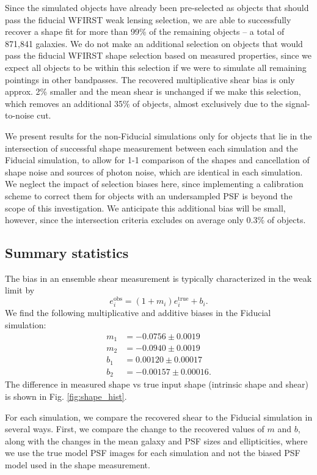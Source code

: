 \documentclass[aps,prd, amsmath,amssymb,superscriptaddress,showkeys,nofootinbib,reprint,preprintnumbers]{revtex4-1}
\begin{document}
Since the simulated objects have already been pre-selected as objects that should pass the fiducial WFIRST weak lensing selection, we are able to successfully recover a shape fit for more than 99\% of the remaining objects -- a total of 871,841 galaxies. 
We do not make an additional selection on objects that would pass the fiducial WFIRST shape selection based on measured properties, since we expect all objects to be within this selection if we were to simulate all remaining pointings in other bandpasses. 
The recovered multiplicative shear bias is only approx. 2\% smaller and the mean shear is unchanged if we make this selection, which removes an additional 35\% of objects, almost exclusively due to the signal-to-noise cut. 

We present results for the non-Fiducial simulations only for objects that lie in the intersection of successful shape measurement between each simulation and the Fiducial simulation, to allow for 1-1 comparison of the shapes and cancellation of shape noise and sources of photon noise, which are identical in each simulation. 
We neglect the impact of selection biases here, since implementing a calibration scheme to correct them for objects with an undersampled PSF is beyond the scope of this investigation. 
We anticipate this additional bias will be small, however, since the intersection criteria excludes on average only 0.3\% of objects.

\subsection{Summary statistics}

The bias in an ensemble shear measurement is typically characterized in the weak limit by 
\begin{equation}
e_i^{\mathrm{obs}} = (1+m_i) e_i^{\mathrm{true}} + b_i.
\end{equation}
We find the following multiplicative and additive biases in the Fiducial simulation: 
\begin{align*}
m_1 &= -0.0756 \pm 0.0019\\ 
m_2 &= -0.0940 \pm 0.0019\\ 
b_1 &= 0.00120 \pm 0.00017\\
b_2 &= -0.00157 \pm 0.00016.
\end{align*}
The difference in measured shape vs true input shape (intrinsic shape and shear) is shown in Fig. \ref{fig:shape_hist}.

For each simulation, we compare the recovered shear to the Fiducial simulation in several ways. First, we compare the change to the recovered values of $m$ and $b$, along with the changes in the mean galaxy and PSF sizes and ellipticities, where we use the true model PSF images for each simulation and not the biased PSF model used in the shape measurement. 
\end{document}
